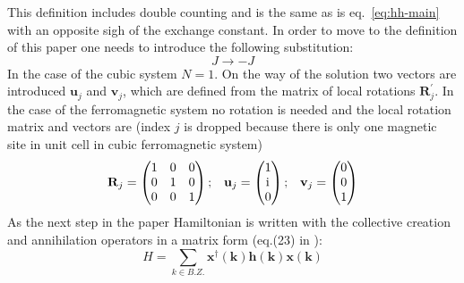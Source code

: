 \documentclass[a4paper,12pt]{article}
\newcommand{\iu}{\mathrm{i}\mkern1mu}
\begin{document}
        This definition includes double counting and is the same as is eq.~\eqref{eq:hh-main} with an opposite sigh of the exchange constant. 
        In order to move to the definition of this paper one needs to introduce the following substitution:
        \begin{equation}
            J \rightarrow -J \label{eq:spinw-sub}
        \end{equation}
        In the case of the cubic system $N = 1$. 
        On the way of the solution two vectors are introduced $\mathbf{u}_j$ and $\mathbf{v}_j$,
        which are defined from the matrix of local rotations $\mathbf{R}^{\prime}_j$. 
        In the case of the ferromagnetic system no rotation is needed and the local rotation matrix and vectors are 
        (index $j$ is dropped because there is only one magnetic site in unit cell in cubic ferromagnetic system)
        \begin{equation}
            \begin{matrix}
                \mathbf{R}_j = 
                \begin{pmatrix}
                    1 & 0 & 0 \\
                    0 & 1 & 0 \\
                    0 & 0 & 1 \\
                \end{pmatrix}; &
                \mathbf{u}_j = 
                \begin{pmatrix}
                    1 \\
                    \iu \\
                    0 \\
                \end{pmatrix}; &
                \mathbf{v}_j = 
                \begin{pmatrix}
                    0 \\
                    0 \\
                    1 \\
                \end{pmatrix}
            \end{matrix}
        \end{equation}
        As the next step in the paper Hamiltonian is written with the collective creation and annihilation operators in a matrix form (eq.(23) in \cite{toth2015linear}):
        \begin{equation}
            H = \sum_{k \in B.Z.}\mathbf{x}^{\dag}(\mathbf{k})\mathbf{h}(\mathbf{k})\mathbf{x}(\mathbf{k})
        \end{equation}
\end{document}
